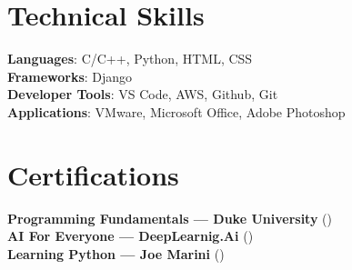 \documentclass[letterpaper,11pt]{article}
\begin{document}
\section{Technical Skills}
 \begin{itemize}[leftmargin=0.15in, label={}]
    \small{\item{
     \textbf{Languages}{: C/C++, Python, HTML, CSS} \\
     \textbf{Frameworks}{: Django} \\
     \textbf{Developer Tools}{: VS Code, AWS, Github, Git} \\
     \textbf{Applications}{: VMware, Microsoft Office, Adobe Photoshop}
    }}
 \end{itemize}

%  

\section{Certifications }
 \begin{itemize}[leftmargin=0.15in, label={}]
    \small{\item{
     \textbf{Programming Fundamentals — Duke University }{ (\href{https://SineshX.github.io}{\color{BlueViolet}{Coursera}}) } \\

     \textbf{AI For Everyone —  DeepLearnig.Ai}{ (\href{https://SineshX.github.io}{\color{BlueViolet}{Coursera}})} \\
     \textbf{Learning Python — Joe Marini}{ (\href{https://SineshX.github.io}{\color{BlueViolet}{Linkedin}})}
    }}
 \end{itemize}


% 

\end{document}

